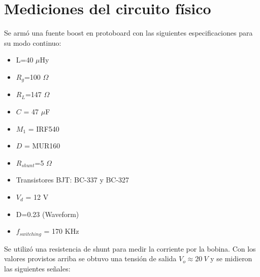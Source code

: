 









\section{Mediciones del circuito físico}
Se armó una fuente boost en protoboard con las siguientes especificaciones para su modo continuo:
\begin{itemize}
\item L=40 $\mu$Hy
\item $R_g$=100 $\Omega$
\item $R_L$=147 $\Omega$
\item $C$ = 47 $\mu$F
\item $M_1$ = IRF540
\item $D$ = MUR160
\item $R_{shunt}$=5 $\Omega$
\item Transistores BJT: BC-337 y BC-327
\item $V_d$ = 12 V
\item D=0.23 (Waveform)
\item $f_{switching}$ = 170 KHz
\end{itemize}
Se utilizó una resistencia de shunt para medir la corriente por la bobina.
Con los valores provistos arriba se obtuvo una tensión de salida $V_o \approx 20 \ V$ y se midieron las siguientes señales:



